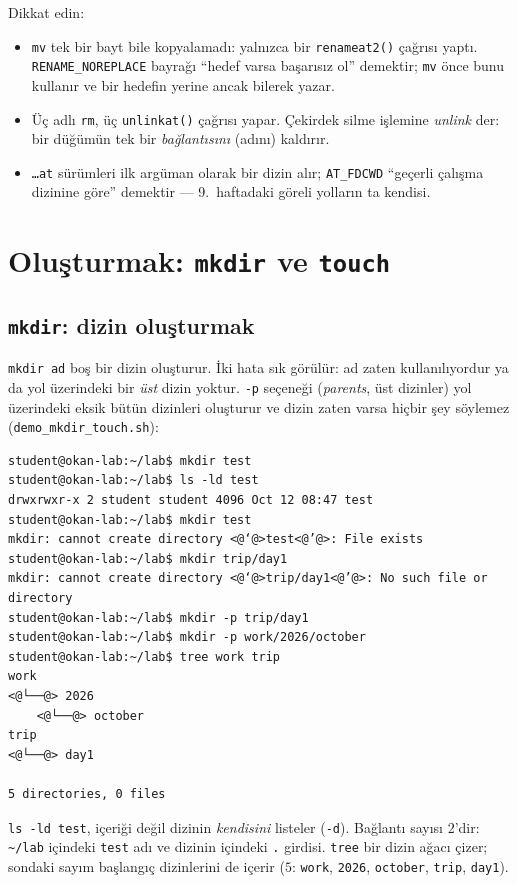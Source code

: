\documentclass[11pt,a4paper]{article}
\newcommand{\cmd}[1]{\texttt{#1}}
\begin{document}
Dikkat edin:
\begin{itemize}
  \item \cmd{mv} tek bir bayt bile kopyalamadı: yalnızca bir \cmd{renameat2()} çağrısı yaptı. \texttt{RENAME\_NOREPLACE} bayrağı ``hedef varsa başarısız ol'' demektir; \cmd{mv} önce bunu kullanır ve bir hedefin yerine ancak bilerek yazar.
  \item Üç adlı \cmd{rm}, üç \cmd{unlinkat()} çağrısı yapar. Çekirdek silme işlemine \emph{unlink} der: bir düğümün tek bir \emph{bağlantısını} (adını) kaldırır.
  \item \texttt{\dots at} sürümleri ilk argüman olarak bir dizin alır; \texttt{AT\_FDCWD} ``geçerli çalışma dizinine göre'' demektir --- 9.~haftadaki göreli yolların ta kendisi.
\end{itemize}

\section{Oluşturmak: \texttt{mkdir} ve \texttt{touch}}

\subsection{\texttt{mkdir}: dizin oluşturmak}

\cmd{mkdir ad} boş bir dizin oluşturur. İki hata sık görülür: ad zaten kullanılıyordur ya da yol üzerindeki bir \emph{üst} dizin yoktur. \cmd{-p} seçeneği (\emph{parents}, üst dizinler) yol üzerindeki eksik bütün dizinleri oluşturur ve dizin zaten varsa hiçbir şey söylemez (\cmd{demo\_mkdir\_touch.sh}):

\begin{lstlisting}[style=term]
student@okan-lab:~/lab$ mkdir test
student@okan-lab:~/lab$ ls -ld test
drwxrwxr-x 2 student student 4096 Oct 12 08:47 test
student@okan-lab:~/lab$ mkdir test
mkdir: cannot create directory <@‘@>test<@’@>: File exists
student@okan-lab:~/lab$ mkdir trip/day1
mkdir: cannot create directory <@‘@>trip/day1<@’@>: No such file or directory
student@okan-lab:~/lab$ mkdir -p trip/day1
student@okan-lab:~/lab$ mkdir -p work/2026/october
student@okan-lab:~/lab$ tree work trip
work
<@└──@> 2026
    <@└──@> october
trip
<@└──@> day1

5 directories, 0 files
\end{lstlisting}

\cmd{ls -ld test}, içeriği değil dizinin \emph{kendisini} listeler (\cmd{-d}). Bağlantı sayısı $2$'dir: \texttt{\textasciitilde/lab} içindeki \texttt{test} adı ve dizinin içindeki \texttt{.} girdisi. \cmd{tree} bir dizin ağacı çizer; sondaki sayım başlangıç dizinlerini de içerir ($5$: \texttt{work}, \texttt{2026}, \texttt{october}, \texttt{trip}, \texttt{day1}).
\end{document}
